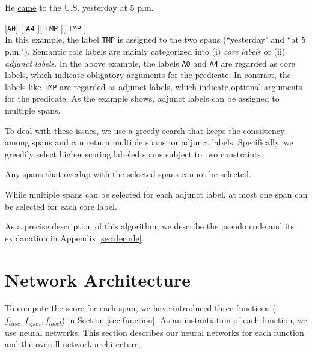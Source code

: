 \documentclass[11pt,a4paper]{article}
\begin{document}
\hspace{0.1cm} He \underline{came} to the U.S. yesterday at 5 p.m.

[{\tt A0}] \hspace{0.75cm} [\hspace{0.35cm} {\tt A4} \hspace{0.35cm}]\hspace{0.1cm}[\hspace{0.2cm} {\tt TMP} \hspace{0.2cm}]\hspace{0.1cm}[\hspace{0.1cm} {\tt TMP} \hspace{0.1cm}]\\

\vspace{-0.2cm}
\noindent
In this example, the label {\tt TMP} is assigned to the two spans (``yesterday" and ``at 5 p.m.").
Semantic role labels are mainly categorized into (i) {\it core labels} or (ii) {\it adjunct labels}.
In the above example, the labels {\tt A0} and {\tt A4} are regarded as core labels, which indicate obligatory arguments for the predicate.
In contrast, the labels like {\tt TMP} are regarded as adjunct labels, which indicate optional arguments for the predicate.
As the example shows, adjunct labels can be assigned to multiple spans.

To deal with these issues, we use a greedy search that keeps the consistency among spans and can return multiple spans for adjunct labels.
Specifically, we greedily select higher scoring labeled spans subject to two constraints.
\begin{description}
\setlength{\parskip}{0cm} 
\setlength{\itemsep}{0cm} 
\item[Overlap Constraint:] Any spans that overlap with the selected spans cannot be selected.
\item[Number Constraint:] While multiple spans can be selected for each adjunct label, at most one span can be selected for each core label.
\end{description}

\noindent
As a precise description of this algorithm, we describe the pseudo code and its explanation in Appendix \ref{sec:decode}. 

\section{Network Architecture}
\label{sec:network}
To compute the score for each span, we have introduced three functions ($f_{base}, f_{span}, f_{label}$) in Section \ref{sec:function}.
As an instantiation of each function, we use neural networks.
This section describes our neural networks for each function and the overall network architecture.
\end{document}
